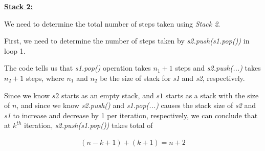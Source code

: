 \documentclass[12pt]{article}
\begin{document}
\begin{enumerate}[a.]











    \bigskip

    \underline{\textbf{Stack 2:}}

    \bigskip

    We need to determine the total number of steps taken using \textit{Stack 2}.

    \bigskip

    First, we need to determine the number of steps taken by \textit{s2.push(s1.pop())} in loop 1.

    \bigskip

    The code tells us that \textit{s1.pop()} operation takes $n_1 + 1$ steps and
    \textit{s2.push(...)} takes $n_2 + 1$ steps, where $n_1$ and $n_2$
    be the size of stack for \textit{s1} and \textit{s2}, respectively.

    \bigskip

    Since we know $s2$ starts as an empty stack, and $s1$ starts as a stack
    with the size of $n$, and since we know \textit{s2.push()} and \textit{s1.pop(...)} causes the
    stack size of \textit{s2} and \textit{s1} to increase and decrease by 1 per iteration, respectively,
    we can conclude that at $k^{th}$ iteration, \textit{s2.push(s1.pop())}
    takes total of

    \begin{align}
        (n - k + 1) + (k + 1) = n + 2
    \end{align}


\end{enumerate}
\end{document}
